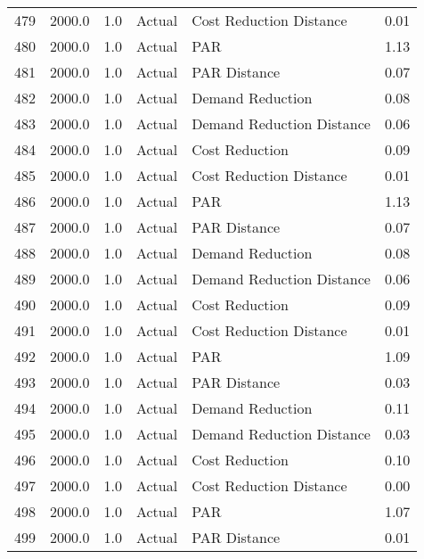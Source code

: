 \begin{longtable}{lrrllr}
479  &       2000.0 &     1.0 &         Actual &    Cost Reduction Distance &   0.01 \\
480  &       2000.0 &     1.0 &         Actual &                        PAR &   1.13 \\
481  &       2000.0 &     1.0 &         Actual &               PAR Distance &   0.07 \\
482  &       2000.0 &     1.0 &         Actual &           Demand Reduction &   0.08 \\
483  &       2000.0 &     1.0 &         Actual &  Demand Reduction Distance &   0.06 \\
484  &       2000.0 &     1.0 &         Actual &             Cost Reduction &   0.09 \\
485  &       2000.0 &     1.0 &         Actual &    Cost Reduction Distance &   0.01 \\
486  &       2000.0 &     1.0 &         Actual &                        PAR &   1.13 \\
487  &       2000.0 &     1.0 &         Actual &               PAR Distance &   0.07 \\
488  &       2000.0 &     1.0 &         Actual &           Demand Reduction &   0.08 \\
489  &       2000.0 &     1.0 &         Actual &  Demand Reduction Distance &   0.06 \\
490  &       2000.0 &     1.0 &         Actual &             Cost Reduction &   0.09 \\
491  &       2000.0 &     1.0 &         Actual &    Cost Reduction Distance &   0.01 \\
492  &       2000.0 &     1.0 &         Actual &                        PAR &   1.09 \\
493  &       2000.0 &     1.0 &         Actual &               PAR Distance &   0.03 \\
494  &       2000.0 &     1.0 &         Actual &           Demand Reduction &   0.11 \\
495  &       2000.0 &     1.0 &         Actual &  Demand Reduction Distance &   0.03 \\
496  &       2000.0 &     1.0 &         Actual &             Cost Reduction &   0.10 \\
497  &       2000.0 &     1.0 &         Actual &    Cost Reduction Distance &   0.00 \\
498  &       2000.0 &     1.0 &         Actual &                        PAR &   1.07 \\
499  &       2000.0 &     1.0 &         Actual &               PAR Distance &   0.01 \\

\end{longtable}

